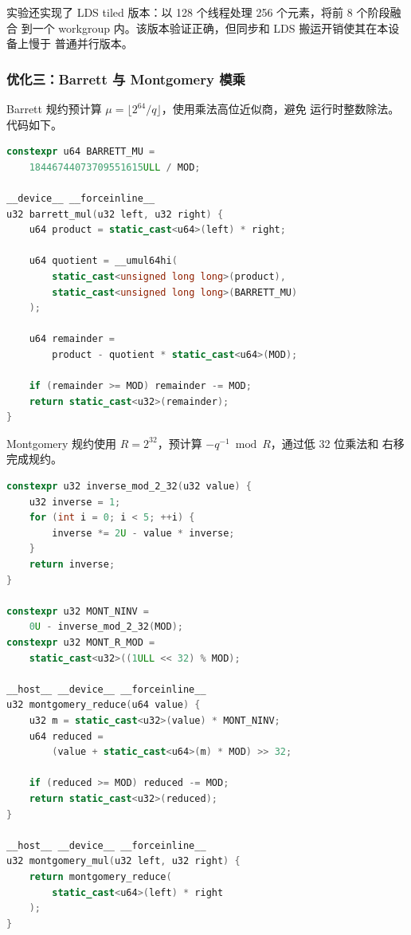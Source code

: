 ﻿\documentclass[a4paper]{article}
\begin{document}
实验还实现了 LDS tiled 版本：以 128 个线程处理 256 个元素，将前 8 个阶段融合
到一个 workgroup 内。该版本验证正确，但同步和 LDS 搬运开销使其在本设备上慢于
普通并行版本。

\subsubsection{优化三：Barrett 与 Montgomery 模乘}

Barrett 规约预计算 $\mu=\lfloor 2^{64}/q\rfloor$，使用乘法高位近似商，避免
运行时整数除法。代码如下。

\begin{lstlisting}[language=C++,caption={Barrett 模乘}]
constexpr u64 BARRETT_MU =
    18446744073709551615ULL / MOD;

__device__ __forceinline__
u32 barrett_mul(u32 left, u32 right) {
    u64 product = static_cast<u64>(left) * right;

    u64 quotient = __umul64hi(
        static_cast<unsigned long long>(product),
        static_cast<unsigned long long>(BARRETT_MU)
    );

    u64 remainder =
        product - quotient * static_cast<u64>(MOD);

    if (remainder >= MOD) remainder -= MOD;
    return static_cast<u32>(remainder);
}
\end{lstlisting}

Montgomery 规约使用 $R=2^{32}$，预计算 $-q^{-1}\bmod R$，通过低 32 位乘法和
右移完成规约。

\begin{lstlisting}[language=C++,caption={Montgomery 规约与模乘}]
constexpr u32 inverse_mod_2_32(u32 value) {
    u32 inverse = 1;
    for (int i = 0; i < 5; ++i) {
        inverse *= 2U - value * inverse;
    }
    return inverse;
}

constexpr u32 MONT_NINV =
    0U - inverse_mod_2_32(MOD);
constexpr u32 MONT_R_MOD =
    static_cast<u32>((1ULL << 32) % MOD);

__host__ __device__ __forceinline__
u32 montgomery_reduce(u64 value) {
    u32 m = static_cast<u32>(value) * MONT_NINV;
    u64 reduced =
        (value + static_cast<u64>(m) * MOD) >> 32;

    if (reduced >= MOD) reduced -= MOD;
    return static_cast<u32>(reduced);
}

__host__ __device__ __forceinline__
u32 montgomery_mul(u32 left, u32 right) {
    return montgomery_reduce(
        static_cast<u64>(left) * right
    );
}
\end{lstlisting}
\end{document}
